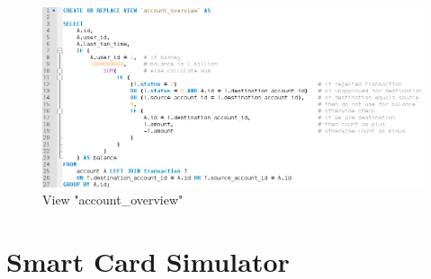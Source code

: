 \begin{description}
\begin{figure}[h!tbp]
	\centering
	\includegraphics[width=\textwidth]{figures/code_account_overview}
	\caption{View "account\_overview"}
	\label{figure:accountoverviewfigure}
\end{figure}

\end{description}

\section{Smart Card Simulator}\label{section:scs}
